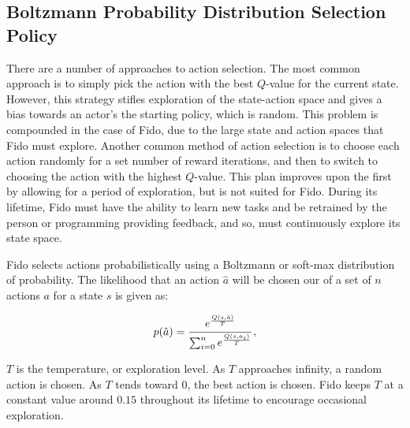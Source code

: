 \subsection{Boltzmann Probability Distribution Selection Policy}

There are a number of approaches to action selection. The most common approach is to simply pick the action with the best $Q$-value for the current state. However, this strategy stifles exploration of the state-action space and gives a bias towards an actor's the starting policy, which is random. This problem is compounded in the case of Fido, due to the large state and action spaces that Fido must explore. Another common method of action selection is to choose each action randomly for a set number of reward iterations, and then to switch to choosing the action with the highest $Q$-value. This plan improves upon the first by allowing for a period of exploration, but is not suited for Fido. During its lifetime, Fido must have the ability to learn new tasks and be retrained by the person or programming providing feedback, and so, must continuously explore its state space.

Fido selects actions probabilistically using a Boltzmann or soft-max distribution of probability. The likelihood that an action $\hat{a}$ will be chosen our of a set of $n$ actions $a$ for a state $s$ is given as:

\begin{equation}
	p(\hat{a}) = \cfrac{e^{\frac{Q(s, \hat{a})}{T}}}{\sum_{i=0}^{n}e^{\frac{Q(s, a_i)}{T}}}
	\,,
\end{equation}

$T$ is the temperature, or exploration level. As $T$ approaches infinity, a random action is chosen. As $T$ tends toward 0, the best action is chosen. Fido keeps $T$ at a constant value around $0.15$ throughout its lifetime to encourage occasional exploration.
